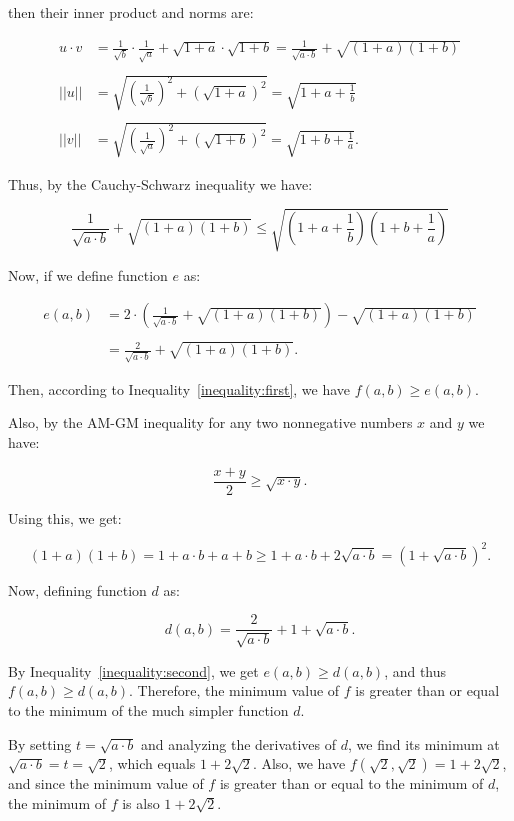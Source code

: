 \begin{solution}
then their inner product and norms are:

\[
\begin{aligned}
u \cdot v &= \frac{1}{\sqrt{b}} \cdot \frac{1}{\sqrt{a}} + \sqrt{1+a} \cdot \sqrt{1+b} = \frac{1}{\sqrt{a \cdot b}} + \sqrt{(1 + a)(1 + b)} \\\\
||u|| &= \sqrt{\left( \frac{1}{\sqrt{b}} \right)^2 + \left( \sqrt{1+a} \right)^2} = \sqrt{1 + a + \frac{1}{b}} \\\\
||v|| &= \sqrt{\left(\frac{1}{\sqrt{a}}\right)^2 + \left(\sqrt{1+b}\right)^2} = \sqrt{1 + b + \frac{1}{a}}.
\end{aligned}
\]

Thus, by the Cauchy-Schwarz inequality we have:

\begin{equation}\label{inequality:first}
\frac{1}{\sqrt{a \cdot b}} + \sqrt{(1 + a)(1 + b)} \leq \sqrt{\left(1 + a + \frac{1}{b}\right)\left(1 + b + \frac{1}{a}\right)}
\end{equation}

Now, if we define function $e$ as:

\[
\begin{aligned}
e(a, b) &= 2 \cdot \left(\frac{1}{\sqrt{a \cdot b}} + \sqrt{(1+a)(1+b)} \right) - \sqrt{(1+a)(1+b)} \\\\
&= \frac{2}{\sqrt{a \cdot b}} + \sqrt{(1+a)(1+b)}.
\end{aligned}
\]

Then, according to Inequality~\ref{inequality:first}, we have $f(a,b) \geq e(a, b)$.

Also, by the AM-GM inequality for any two nonnegative numbers $x$ and $y$ we have:

\[
\frac{x+y}{2} \geq \sqrt{x\cdot y}.
\]

Using this, we get:

\begin{equation}\label{inequality:second}
(1+a)(1+b) = 1 + a \cdot b + a + b \geq 1 + a \cdot b + 2\sqrt{a \cdot b} = (1 + \sqrt{a \cdot b})^2.
\end{equation}

Now, defining function $d$ as:

\[
d(a, b) = \frac{2}{\sqrt{a \cdot b}} + 1 + \sqrt{a \cdot b}.
\]

By Inequality~\ref{inequality:second}, we get $e(a, b) \geq d(a, b)$, and thus $f(a, b) \geq d(a, b)$. Therefore, the minimum value of $f$ is greater than or equal to the minimum of the much simpler function $d$.

By setting $t = \sqrt{a \cdot b}$ and analyzing the derivatives of $d$, we find its minimum at $\sqrt{a \cdot b} = t = \sqrt{2}$, which equals $1 + 2 \sqrt{2}$. Also, we have $f(\sqrt{2}, \sqrt{2}) = 1 + 2 \sqrt{2}$, and since the minimum value of $f$ is greater than or equal to the minimum of $d$, the minimum of $f$ is also $1 + 2 \sqrt{2}$.


\end{solution}


